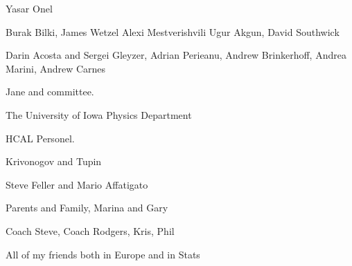 Yasar Onel

Burak Bilki, James Wetzel Alexi Mestverishvili Ugur Akgun, David Southwick

Darin Acosta and Sergei Gleyzer, Adrian Perieanu, Andrew Brinkerhoff, Andrea Marini, Andrew Carnes

Jane and committee.

The University of Iowa Physics Department

HCAL Personel.

Krivonogov and Tupin

Steve Feller and Mario Affatigato

Parents and Family, Marina and Gary

Coach Steve, Coach Rodgers, Kris, Phil

All of my friends both in Europe and in Stats






